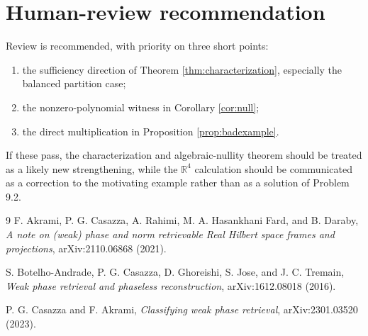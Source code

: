 \documentclass[11pt]{article}
\newcommand{\R}{\mathbb{R}}
\begin{document}
\section{Human-review recommendation}

Review is recommended, with priority on three short points:
\begin{enumerate}
\item the sufficiency direction of Theorem \ref{thm:characterization},
especially the balanced partition case;
\item the nonzero-polynomial witness in Corollary \ref{cor:null};
\item the direct multiplication in Proposition \ref{prop:badexample}.
\end{enumerate}
If these pass, the characterization and algebraic-nullity theorem should be
treated as a likely new strengthening, while the $\R^4$ calculation should be
communicated as a correction to the motivating example rather than as a
solution of Problem 9.2.

\begin{thebibliography}{9}
F. Akrami, P. G. Casazza, A. Rahimi, M. A. Hasankhani Fard, and B. Daraby,
\emph{A note on (weak) phase and norm retrievable Real Hilbert space frames
and projections}, arXiv:2110.06868 (2021).

S. Botelho-Andrade, P. G. Casazza, D. Ghoreishi, S. Jose, and J. C. Tremain,
\emph{Weak phase retrieval and phaseless reconstruction},
arXiv:1612.08018 (2016).

P. G. Casazza and F. Akrami,
\emph{Classifying weak phase retrieval}, arXiv:2301.03520 (2023).
\end{thebibliography}
\end{document}
